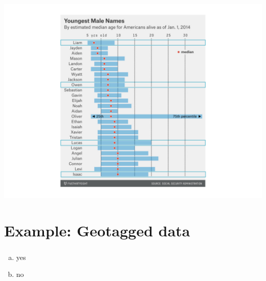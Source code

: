 \documentclass[slidestop,compress,mathserif,12pt,t,professionalfonts,xcolor=table]{beamer}
\begin{document}

\begin{frame}
\frametitle{}

\begin{center}
\includegraphics[width=\textwidth]{figures/youngnamesclass538_male}
\end{center}

\end{frame}


\section{Example: Geotagged data}


\begin{frame}
\frametitle{}


\begin{enumerate}[(a)]
\item yes
\item no
\end{enumerate}

\end{frame}

\end{document}
